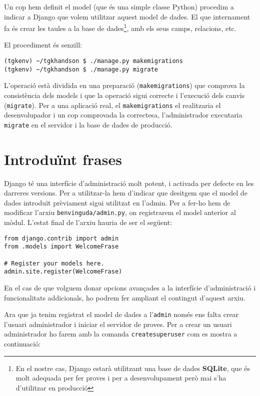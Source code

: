\documentclass[11pt,a4paper]{article}
\begin{document}
Un cop hem definit el model (que és una simple classe Python) procedim a indicar a Django que volem utilitzar aquest model de dades. El que internament fa és crear les taules a la base de dades\footnote{En el nostre cas, Django estarà utilitzant una base de dades \textbf{SQLite}, que és molt adequada per fer proves i per a desenvolupament però mai s'ha d'utilitzar en producció}, amb els seus camps, relacions, etc.

El procediment és senzill:

\begin{verbatim}
(tgkenv) ~/tgkhandson $ ./manage.py makemigrations
(tgkenv) ~/tgkhandson $ ./manage.py migrate
\end{verbatim}

L'operació està dividida en una preparació (\verb+makemigrations+) que comprova la consistència dels models i que la operació sigui correcte i l'execució dels canvis (\verb+migrate+). Per a una aplicació real, el \verb+makemigrations+ el realitzaria el desenvolupador i un cop comprovada la correctesa, l'administrador executaria \verb+migrate+ en el servidor i la base de dades de producció.

\section{Introduïnt frases}

Django té una interfície d'administració molt potent, i activada per defecte en les darreres versions. Per a utilitzar-la hem d'indicar que desitgem que el model de dades introduït prèviament sigui utilitzat en l'admin. Per a fer-ho hem de modificar l'arxiu \verb+benvinguda/admin.py+, on registrarem el model anterior al mòdul. L'estat final de l'arxiu hauria de ser el següent:

\begin{lstlisting}
from django.contrib import admin
from .models import WelcomeFrase

# Register your models here.
admin.site.register(WelcomeFrase)
\end{lstlisting}

En el cas de que volguem donar opcions avançades a la interfície d'administració i funcionalitats addicionals, ho podrem fer ampliant el contingut d'aquest arxiu.

Ara que ja tenim registrat el model de dades a l'\verb+admin+ només ens falta crear l'usuari administrador i iniciar el servidor de proves. Per a crear un usuari administrador ho farem amb la comanda \verb+createsuperuser+ com es mostra a continuació:
\end{document}

